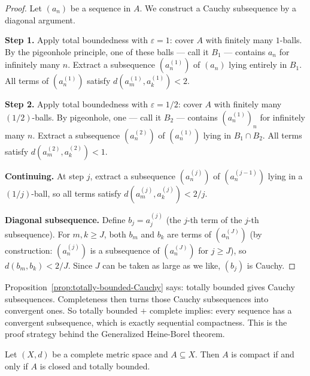 \begin{proof}
Let $(a_n)$ be a sequence in $A$.
We construct a Cauchy subsequence by a diagonal argument.

\medskip
\noindent\textbf{Step 1.}
Apply total boundedness with $\varepsilon = 1$:
cover $A$ with finitely many $1$-balls.
By the pigeonhole principle, one of these balls ---
call it $B_1$ --- contains $a_n$ for infinitely many $n$.
Extract a subsequence $(a_n^{(1)})$ of $(a_n)$ lying entirely in $B_1$.
All terms of $(a_n^{(1)})$ satisfy $d(a_m^{(1)}, a_k^{(1)}) < 2$.

\medskip
\noindent\textbf{Step 2.}
Apply total boundedness with $\varepsilon = 1/2$:
cover $A$ with finitely many $(1/2)$-balls.
By pigeonhole, one --- call it $B_2$ --- contains $(a_n^{(1)})_n$
for infinitely many $n$.
Extract a subsequence $(a_n^{(2)})$ of $(a_n^{(1)})$ lying in $B_1 \cap B_2$.
All terms satisfy $d(a_m^{(2)}, a_k^{(2)}) < 1$.

\medskip
\noindent\textbf{Continuing.}
At step $j$, extract a subsequence $(a_n^{(j)})$ of $(a_n^{(j-1)})$
lying in a $(1/j)$-ball, so all terms satisfy
$d(a_m^{(j)}, a_k^{(j)}) < 2/j$.

\medskip
\noindent\textbf{Diagonal subsequence.}
Define $b_j = a_j^{(j)}$ (the $j$-th term of the $j$-th subsequence).
For $m, k \ge J$, both $b_m$ and $b_k$ are terms of $(a_n^{(J)})$
(by construction: $(a_n^{(j)})$ is a subsequence of $(a_n^{(J)})$ for $j \ge J$),
so $d(b_m, b_k) < 2/J$.
Since $J$ can be taken as large as we like, $(b_j)$ is Cauchy.
\end{proof}

\begin{remark*}
Proposition~\ref{prop:totally-bounded-Cauchy} says: totally bounded
gives Cauchy subsequences.
Completeness then turns those Cauchy subsequences into convergent ones.
So totally bounded $+$ complete implies: every sequence has a convergent
subsequence, which is exactly sequential compactness.
This is the proof strategy behind the Generalized Heine-Borel theorem.
\end{remark*}


\begin{tcolorbox}[colback=thmbox, colframe=thmborder, arc=2pt,
  left=6pt, right=6pt, top=4pt, bottom=4pt,
  title={\small\textbf{Theorem (Generalized Heine-Borel --- Pugh Theorem 65)}},
  fonttitle=\small\bfseries]
\begin{theorem}
\label{thm:gen-heine-borel}
Let $(X,d)$ be a complete metric space and $A \subseteq X$.
Then $A$ is compact if and only if $A$ is closed and totally bounded.
\end{theorem}
\end{tcolorbox}

